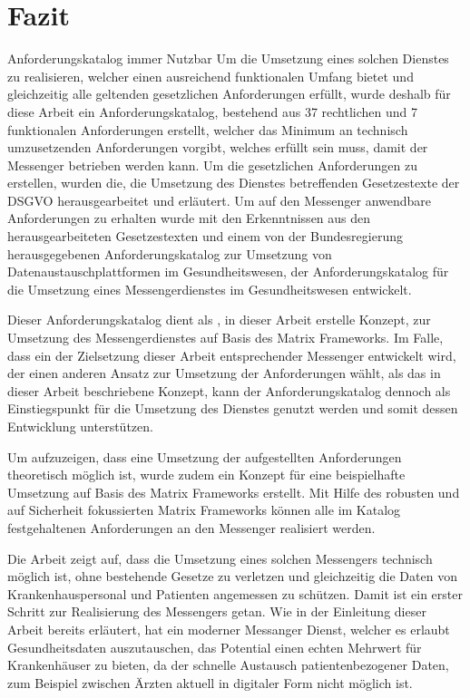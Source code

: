 \section{Fazit}\label{chapter:fazit}
Anforderungskatalog immer Nutzbar
Um die Umsetzung eines solchen Dienstes zu realisieren, welcher einen ausreichend funktionalen Umfang bietet und gleichzeitig alle geltenden gesetzlichen Anforderungen erfüllt, wurde deshalb für diese Arbeit ein Anforderungskatalog, bestehend aus 37 rechtlichen und 7 funktionalen Anforderungen erstellt, welcher das Minimum an technisch umzusetzenden Anforderungen vorgibt, welches erfüllt sein muss, damit der Messenger betrieben werden kann. Um die gesetzlichen Anforderungen zu erstellen, wurden die, die Umsetzung des Dienstes betreffenden Gesetzestexte der DSGVO herausgearbeitet und erläutert. Um auf den Messenger anwendbare Anforderungen zu erhalten wurde mit den Erkenntnissen aus den herausgearbeiteten Gesetzestexten und einem von der Bundesregierung herausgegebenen Anforderungskatalog zur Umsetzung von Datenaustauschplattformen im Gesundheitswesen, der Anforderungskatalog für die Umsetzung eines Messengerdienstes im Gesundheitswesen entwickelt.

Dieser Anforderungskatalog dient als , in dieser Arbeit erstelle Konzept, zur Umsetzung des Messengerdienstes auf Basis des Matrix Frameworks. Im Falle, dass ein der Zielsetzung dieser Arbeit entsprechender Messenger entwickelt wird, der einen anderen Ansatz zur Umsetzung der Anforderungen wählt, als das in dieser Arbeit beschriebene Konzept, kann der Anforderungskatalog dennoch als Einstiegspunkt für die Umsetzung des Dienstes genutzt werden und somit dessen Entwicklung unterstützen.

Um aufzuzeigen, dass eine Umsetzung der aufgestellten Anforderungen theoretisch möglich ist, wurde zudem ein Konzept für eine beispielhafte Umsetzung auf Basis des Matrix Frameworks erstellt. Mit Hilfe des robusten und auf Sicherheit fokussierten Matrix Frameworks können alle im Katalog festgehaltenen Anforderungen an den Messenger realisiert werden. 

Die Arbeit zeigt auf, dass die Umsetzung eines solchen Messengers technisch möglich ist, ohne bestehende Gesetze zu verletzen und gleichzeitig die Daten von Krankenhauspersonal und Patienten angemessen zu schützen.
Damit ist ein erster Schritt zur Realisierung des Messengers getan. Wie in der Einleitung dieser Arbeit bereits erläutert, hat ein moderner Messanger Dienst, welcher es erlaubt Gesundheitsdaten auszutauschen, das Potential einen echten Mehrwert für Krankenhäuser zu bieten, da der schnelle Austausch patientenbezogener Daten, zum Beispiel zwischen Ärzten aktuell in digitaler Form nicht möglich ist. 


